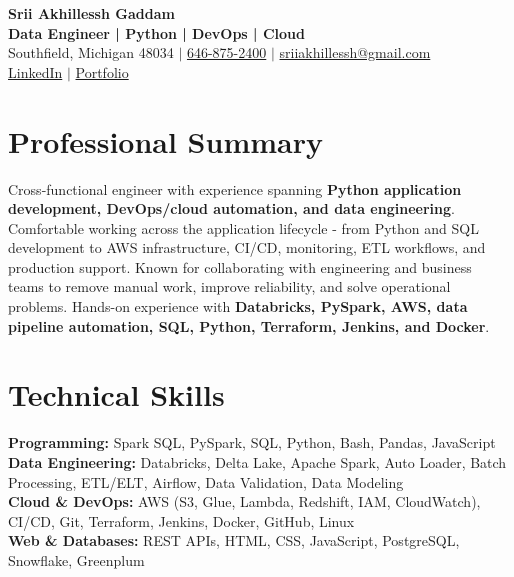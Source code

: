 \documentclass[letterpaper,10pt]{article}
\begin{document}
\fontsize{9.35pt}{10.45pt}\selectfont

\begin{center}
    {\LARGE \textbf{Srii Akhillessh Gaddam}} \\[-1pt]
    \textbf{Data Engineer | Python | DevOps | Cloud} \\[2pt]
    Southfield, Michigan 48034 $|$
    \href{tel:6468752400}{646-875-2400} $|$
    \href{mailto:sriiakhillessh@gmail.com}{sriiakhillessh@gmail.com} \\[1pt]
    \href{https://www.linkedin.com/in/srii-akhiilessh-gaddam-b48668191/}{LinkedIn} $|$
    \href{https://sriiakhillesshg.github.io/portfolio/}{Portfolio}
\end{center}
\vspace{-8pt}

\section{Professional Summary}
\small{Cross-functional engineer with experience spanning \textbf{Python application development, DevOps/cloud automation, and data engineering}. Comfortable working across the application lifecycle - from Python and SQL development to AWS infrastructure, CI/CD, monitoring, ETL workflows, and production support. Known for collaborating with engineering and business teams to remove manual work, improve reliability, and solve operational problems. Hands-on experience with \textbf{Databricks, PySpark, AWS, data pipeline automation, SQL, Python, Terraform, Jenkins, and Docker}.}

\section{Technical Skills}
\small{
\textbf{Programming:} Spark SQL, PySpark, SQL, Python, Bash, Pandas, JavaScript \\
\textbf{Data Engineering:} Databricks, Delta Lake, Apache Spark, Auto Loader, Batch Processing, ETL/ELT, Airflow, Data Validation, Data Modeling \\
\textbf{Cloud \& DevOps:} AWS (S3, Glue, Lambda, Redshift, IAM, CloudWatch), CI/CD, Git, Terraform, Jenkins, Docker, GitHub, Linux \\
\textbf{Web \& Databases:} REST APIs, HTML, CSS, JavaScript, PostgreSQL, Snowflake, Greenplum
}
\end{document}
